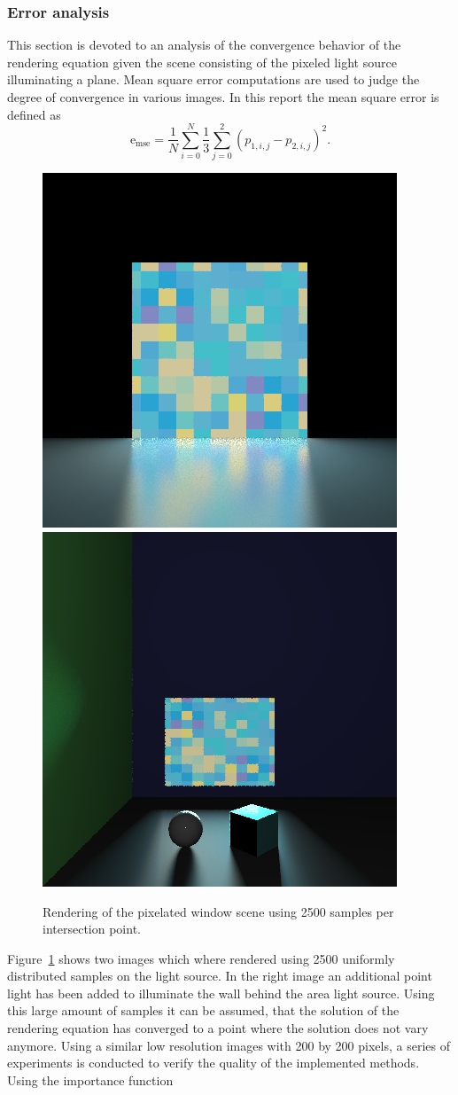 \subsubsection{Error analysis}
This section is devoted to an analysis of the convergence behavior of the rendering equation given the scene consisting of the pixeled light source illuminating a plane. Mean square error computations are used to judge the degree of convergence in various images. In this report the mean square error is defined as
\begin{equation}
\text{e}_{\text{mse}} = \frac{1}{N} \sum\limits_{i = 0}^{N} \frac{1}{3}\sum\limits_{j = 0}^{2} (p_{1,i,j} - p_{2,i,j} )^2.
\end{equation}
\begin{figure}
\centering
\includegraphics[width=0.4\linewidth]{./img/output2500v2}
\includegraphics[width=0.4\linewidth]{./img/exp4}
\caption{Rendering of the pixelated window scene using 2500 samples per intersection point.}
\label{fig:output2500}
\end{figure}
Figure~\ref{fig:output2500} shows two images which where rendered using 2500 uniformly distributed samples on the light source. In the right image an additional point light has been added to illuminate the wall behind the area light source. Using this large amount of samples it can be assumed, that the solution of the rendering equation has converged to a point where the solution does not vary anymore. Using a similar low resolution images with 200 by 200 pixels, a series of experiments is conducted to verify the quality of the implemented methods. Using the importance function 
